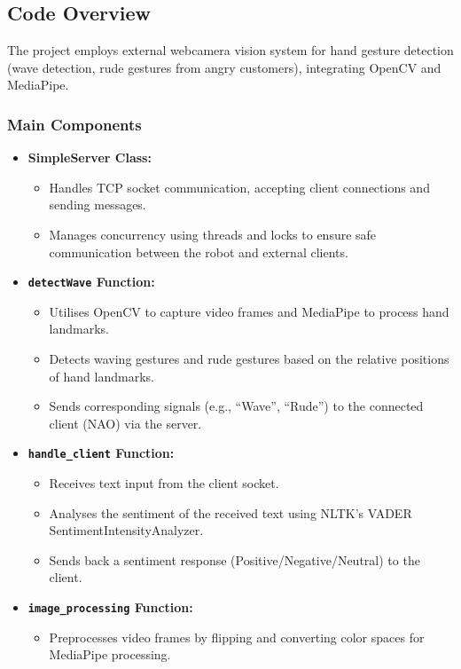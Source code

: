 \documentclass[conference]{IEEEtran}
\begin{document}
\subsection{Code Overview}

The project employs external webcamera vision system for hand gesture detection (wave detection, rude gestures from angry customers), integrating OpenCV and MediaPipe.

\subsubsection{Main Components}
\begin{itemize}
  \item \textbf{SimpleServer Class:} 
    \begin{itemize}
      \item Handles TCP socket communication, accepting client connections and sending messages.
      \item Manages concurrency using threads and locks to ensure safe communication between the robot and external clients.
    \end{itemize}
  \item \textbf{\texttt{detectWave} Function:} 
    \begin{itemize}
      \item Utilises OpenCV to capture video frames and MediaPipe to process hand landmarks.
      \item Detects waving gestures and rude gestures based on the relative positions of hand landmarks.
      \item Sends corresponding signals (e.g., ``Wave'', ``Rude'') to the connected client (NAO) via the server.
    \end{itemize}
  \item \textbf{\texttt{handle\_client} Function:} 
    \begin{itemize}
      \item Receives text input from the client socket.
      \item Analyses the sentiment of the received text using NLTK's VADER SentimentIntensityAnalyzer.
      \item Sends back a sentiment response (Positive/Negative/Neutral) to the client.
    \end{itemize}
  \item \textbf{\texttt{image\_processing} Function:} 
    \begin{itemize}
      \item Preprocesses video frames by flipping and converting color spaces for MediaPipe processing.
    \end{itemize}
\end{itemize}
\end{document}
